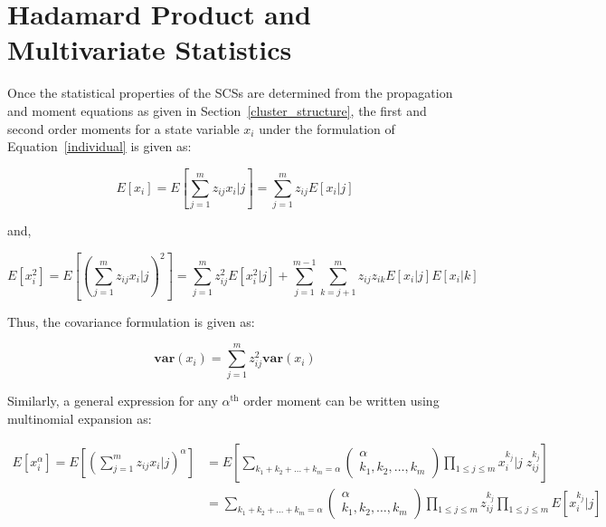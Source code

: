 \section{Hadamard Product and Multivariate Statistics}
\label{hadamard_statistics}


Once the statistical properties of the SCSs are determined from the propagation and moment equations as given in Section~\ref{cluster_structure}, the first and second order moments for a state variable $x_i$  under the formulation of Equation~\ref{individual} is given as:

\begin{equation}
E \left[x_i \right] = E \left[ \sum_{j=1}^m z_{ij} x_{i}|j \right] =\sum_{j=1}^m  z_{ij} E \left[  x_{i}|j  \right]  
\end{equation}

and,

\begin{equation}
E \left[x_i^2 \right] = E \left[ \left( \sum_{j=1}^m z_{ij} x_{i}|j  \right)^2 \right] =\sum_{j=1}^m  z_{ij}^2 E \left[  x^2_{i}|j  \right]  + \sum_{j=1}^{m-1} \sum_{k=j+1}^m z_{ij}z_{ik}  E \left[  x_{i}|j  \right] E \left[  x_{i}|k  \right]
\end{equation}

Thus, the covariance formulation is given as: 

\begin{equation}
\mathbf{var}(x_i) = \sum_{j=1}^m z^2_{ij} \mathbf{var} (x_{i})
\end{equation}



\noindent Similarly, a general expression for any $\alpha^{\text{th}}$ order moment can be written using multinomial expansion as:

\begin{equation}
\begin{array}{ll}
E \left[x_i^{\alpha} \right] = \displaystyle E \left[ \left( \sum_{j=1}^m z_{ij} x_{i}|j  \right)^{\alpha} \right] &= \displaystyle E \left[ \sum_{k_1 + k_2 + \ldots + k_m = \alpha} \begin{pmatrix}
\alpha \\ k_1,k_2,\ldots,k_m
\end{pmatrix}  \prod_{1 \leq j \leq m} x^{k_j}_{i}|j  \; z^{k_j}_{ij} \right] \\
&= \displaystyle  \sum_{k_1 + k_2 + \ldots + k_m = \alpha} \begin{pmatrix}
\alpha \\ k_1,k_2,\ldots,k_m
\end{pmatrix}  \prod_{1 \leq j \leq m} z^{k_j}_{ij} \prod_{1 \leq j \leq m} E \left[ x^{k_j}_{i}|j \right]
\end{array}
\end{equation}

